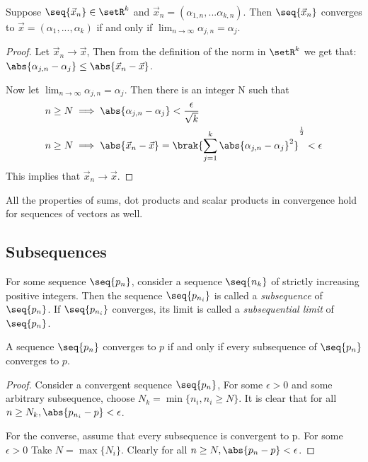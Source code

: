 \documentclass[12pt, letterpaper]{paper}
\begin{document}
\begin{theorem}
  \label{thr:3.4}
  Suppose $\seq{\vec{x}_n} \in \setR^k$ and
  $\vec{x}_n = ( \alpha_{1,n}, ... \alpha_{k,n} )$. Then
  $\seq{\vec{x}_n}$ converges to
  $\vec{x} = ( \alpha_1, ..., \alpha_k )$ if and only if
  $\lim_{n\to \infty} \alpha_{j,n} = \alpha_j$.
\end{theorem}
\begin{proof}
  Let $\vec{x}_n \to \vec{x}$, Then from the definition of the norm in
  $\setR^k$ we get that:
  $\abs{ \alpha_{j,n}- \alpha_j} \leq \abs{\vec{x}_n - \vec{x}}$.

  Now let $\lim_{n\to \infty} \alpha_{j,n} = \alpha_j$. Then there is
  an integer N such that
  \begin{align*}
    n \geq N &\implies \abs{ \alpha_{j,n} - \alpha_j} <
               \frac{\epsilon}{\sqrt{k}}\\
    n \geq N &\implies \abs{ \vec{x}_n - \vec{x}} = \brak{
               \sum_{j=1}^k \abs{ \alpha_{j,n} - \alpha_j}^2 }^{\frac{1}{2}} < \epsilon
  \end{align*}
  This implies that $\vec{x}_n \to \vec{x}$.
\end{proof}

All the properties of sums, dot products and scalar products in
convergence hold for sequences of vectors as well.

\subsection{Subsequences}
\label{sec:3.2}
For some sequence $\seq{p_{n}}$, consider a sequence $\seq{n_{k}}$ of
strictly increasing positive integers. Then the sequence
$\seq{p_{n_{i}}}$ is called a \emph{subsequence} of $\seq{p_{n}}$. If
$\seq{p_{n_{i}}}$ converges, its limit is called a \emph{subsequential
  limit} of $\seq{p_{n}}$.

\begin{theorem}
  \label{thr:3.0}
  A sequence $\seq{p_n}$ converges to $p$ if and only if every
  subsequence of $\seq{p_n}$ converges to $p$.
\end{theorem}
\begin{proof}
  Consider a convergent sequence $\seq{p_n}$, For some $\epsilon > 0$
  and some arbitrary subsequence, choose
  $N_k = \min \{n_i, n_i \geq N \}$. It is clear that for all
  $n \geq N_k, \abs{ p_{n_i} - p} < \epsilon$.

  For the converse, assume that every subsequence is convergent to
  p. For some $\epsilon > 0$ Take $N = \max \{ N_i \}$. Clearly for
  all $n \geq N, \abs{ p_n - p} < \epsilon$.
\end{proof}
\end{document}
